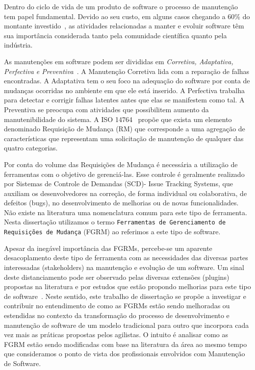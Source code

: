Dentro do ciclo de vida de um produto de software o processo de manutenção tem
papel fundamental. Devido ao seu custo, em alguns casos chegando a 60\% do
montante investido~\cite{kaur2015review}, as atividades relacionadas a manter e
evoluir software têm sua importância considerada tanto pela comunidade
científica quanto pela indústria.

As manutenções em software podem ser divididas em \textit{Corretiva, Adaptativa,
Perfectiva e Preventiva}~\cite{Lientz:1980:SMM:601062,159342}. A Manutenção
Corretiva lida com a reparação de falhas encontradas. A Adaptativa tem o seu
foco na adequação do software por conta de mudanças ocorridas no ambiente em que
ele está inserido. A Perfectiva trabalha para detectar e corrigir falhas
latentes antes que elas se manifestem como tal. A Preventiva se preocupa com
atividades que possibilitem aumento da manutenibilidade do sistema. A ISO
14764~\cite{1703974} propõe que exista um elemento denominado Requisição de
Mudança (RM) que corresponde a uma agregação de características que representam
uma solicitação de manutenção de qualquer das quatro categorias.

Por conta do volume das Requisições de Mudança é necessária a utilização de
ferramentas com o objetivo de gerenciá-las. Esse controle é geralmente realizado
por Sistemas de Controle de Demandas (SCD)- Issue Tracking Systems, que auxiliam
os desenvolvedores na correção, de forma individual ou colaborativa, de defeitos
(bugs), no desenvolvimento de melhorias ou de novas funcionalidades. Não existe
na literatura uma nomenclatura comum para este tipo de ferramenta. Nesta
dissertação utilizamos o termo \texttt{Ferramentas de Gerenciamento de
Requisições de Mudança} (FGRM) ao referimos a este tipo de software.

Apesar da inegável importância das FGRMs, percebe-se um aparente desacoplamento
deste tipo de ferramenta com as necessidades das diversas partes interessadas
(stakeholders) na manutenção e evolução de um software. Um sinal deste
distanciamento pode ser observado pelas diversas extensões (plugins) propostas
na literatura
\cite{101186,Thung:2014:BIT:2635868.2661678,Kononenko:2014:DED:2591062.2591075}
e por estudos que estão propondo melhorias para este tipo de
software~\cite{bettenburg2008makes, cavalcanti2014challenges,
zimmermann2009improving}. Neste sentido, este trabalho de dissertação se propõe
a investigar e contribuir no entendimento de como as FGRMs estão sendo
melhoradas ou estendidas no contexto da transformação do processo de
desenvolvimento e manutenção de software de um modelo tradicional para outro que
incorpora cada vez mais as práticas propostas pelos agilistas. O intuito é
analisar como as FGRM estão sendo modificadas com base na literatura da área ao
mesmo tempo que consideramos o ponto de vista dos profissionais envolvidos com
Manutenção de Software.

